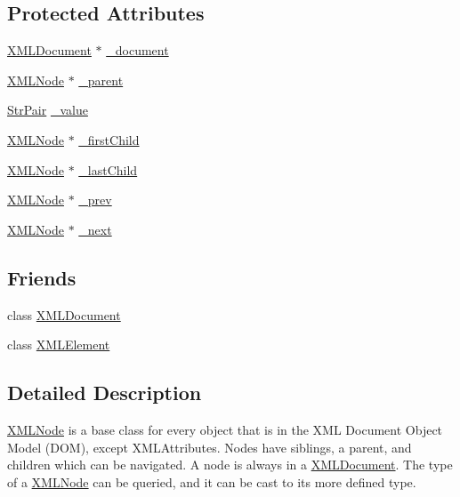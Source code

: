 \subsection*{Protected Attributes}
\begin{DoxyCompactItemize}
\item 
\hyperlink{classtinyxml2_1_1_x_m_l_document}{X\-M\-L\-Document} $\ast$ \hyperlink{classtinyxml2_1_1_x_m_l_node_a8d2d2be0bb6797625551eb0e91f0ff62}{\-\_\-document}
\item 
\hyperlink{classtinyxml2_1_1_x_m_l_node}{X\-M\-L\-Node} $\ast$ \hyperlink{classtinyxml2_1_1_x_m_l_node_a176dd1c4965c21c366de192164aa2c13}{\-\_\-parent}
\item 
\hyperlink{classtinyxml2_1_1_str_pair}{Str\-Pair} \hyperlink{classtinyxml2_1_1_x_m_l_node_a3ea9884098b8379de2bb5ab3fc85c0fc}{\-\_\-value}
\item 
\hyperlink{classtinyxml2_1_1_x_m_l_node}{X\-M\-L\-Node} $\ast$ \hyperlink{classtinyxml2_1_1_x_m_l_node_aa20c91e4213dc930c5bdf420322ca342}{\-\_\-first\-Child}
\item 
\hyperlink{classtinyxml2_1_1_x_m_l_node}{X\-M\-L\-Node} $\ast$ \hyperlink{classtinyxml2_1_1_x_m_l_node_a099b6560ae44ab9edb8453aaf1a3747b}{\-\_\-last\-Child}
\item 
\hyperlink{classtinyxml2_1_1_x_m_l_node}{X\-M\-L\-Node} $\ast$ \hyperlink{classtinyxml2_1_1_x_m_l_node_a9739eb0fb9a1188266052055e7a6bf6b}{\-\_\-prev}
\item 
\hyperlink{classtinyxml2_1_1_x_m_l_node}{X\-M\-L\-Node} $\ast$ \hyperlink{classtinyxml2_1_1_x_m_l_node_a27e985496b37dd00eb5b9cf59b9e3fb1}{\-\_\-next}
\end{DoxyCompactItemize}
\subsection*{Friends}
\begin{DoxyCompactItemize}
\item 
class \hyperlink{classtinyxml2_1_1_x_m_l_node_a4eee3bda60c60a30e4e8cd4ea91c4c6e}{X\-M\-L\-Document}
\item 
class \hyperlink{classtinyxml2_1_1_x_m_l_node_ac2fba9b6e452829dd892f7392c24e0eb}{X\-M\-L\-Element}
\end{DoxyCompactItemize}


\subsection{Detailed Description}
\hyperlink{classtinyxml2_1_1_x_m_l_node}{X\-M\-L\-Node} is a base class for every object that is in the X\-M\-L Document Object Model (D\-O\-M), except X\-M\-L\-Attributes. Nodes have siblings, a parent, and children which can be navigated. A node is always in a \hyperlink{classtinyxml2_1_1_x_m_l_document}{X\-M\-L\-Document}. The type of a \hyperlink{classtinyxml2_1_1_x_m_l_node}{X\-M\-L\-Node} can be queried, and it can be cast to its more defined type.

